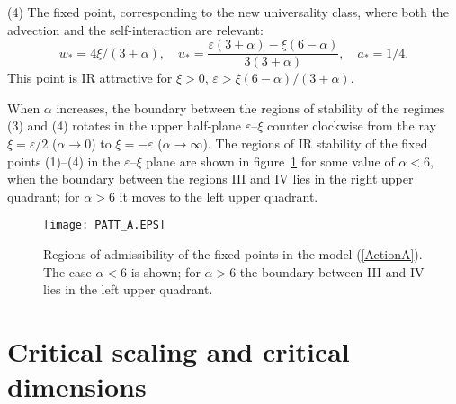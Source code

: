 \documentclass[12pt]{iopart}
\begin{document}
(4) The fixed point, corresponding to the new universality class, where
both the advection and the self-interaction are relevant:
\begin{equation}
w_{*}= 4\xi/(3+\alpha), \quad u_{*} = \frac{ \varepsilon (3+\alpha) -
\xi(6-\alpha)} {3(3+\alpha)}, \quad a_{*}=1/4.
\label{wu44}
\end{equation}
This point is IR attractive for $\xi>0$,
$\varepsilon> \xi (6-\alpha)/(3+\alpha)$.

When $\alpha$ increases, the boundary between the regions of stability of
the regimes (3) and (4) rotates in the upper half-plane $\varepsilon$--$\xi$
counter clockwise from the ray $\xi=\varepsilon/2$ ($\alpha\to0$) to
$\xi=-\varepsilon$ ($\alpha\to\infty$).
The regions of IR stability of the fixed points (1)--(4) in the
$\varepsilon$--$\xi$ plane are shown in figure~\ref{fig:pattA}
for some value of $\alpha<6$, when the boundary between the regions
III and IV lies in the right upper quadrant; for $\alpha>6$ it moves
to the left upper quadrant.

\begin{figure}
\begin{center}
\texttt{[image: PATT\_A.EPS]}
\caption{\label{fig:pattA} Regions of admissibility of the fixed points
in the model (\protect\ref{ActionA}). The case $\alpha<6$ is shown;
for $\alpha>6$ the boundary between III and IV lies in the left
upper quadrant.}
\end{center}
\end{figure}


\section{Critical scaling and critical dimensions} \label{sec:DimeNS}
\end{document}
